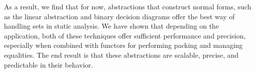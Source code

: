 As a result, we find that for now, abstractions that construct normal forms, such as the linear abstraction and binary decision diagrams offer the best way of handling sets in static analysis.  We have shown that depending on the application, both of these techniques offer sufficient performance and precision, especially when combined with functors for performing packing and managing equalities.  The end result is that these abstractions are scalable, precise, and predictable in their behavior.